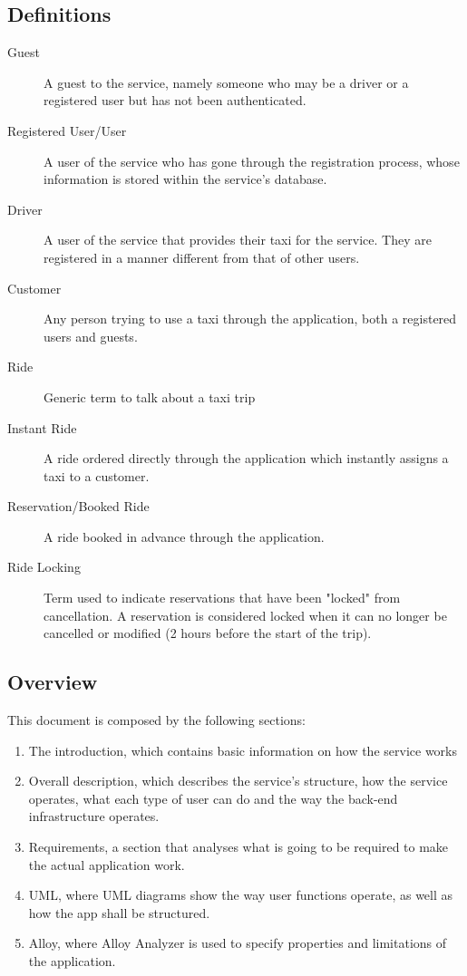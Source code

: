 \subsection{Definitions}
	\begin{description}
		\item[Guest]
			A guest to the service, namely someone who may be a driver or a registered user but has not been authenticated.
		\item[Registered User/User]
			A user of the service who has gone through the registration process, whose information is stored within the service's database.
		\item[Driver]
			A user of the service that provides their taxi for the service. They are registered in a manner different from that of other users.
		\item[Customer]
			Any person trying to use a taxi through the application, both a registered users and guests.
		\item[Ride]
			Generic term to talk about a taxi trip
		\item[Instant Ride]
			A ride ordered directly through the application which instantly assigns a taxi to a customer.
		\item[Reservation/Booked Ride]
			A ride booked in advance through the application.
		\item[Ride Locking]
			Term used to indicate reservations that have been "locked" from cancellation. A reservation is considered locked when it can no 
			longer be cancelled or modified (2 hours before the start of the trip).
	\end{description}
\subsection{Overview}
	This document is composed by the following sections:
	\begin{enumerate}
	\item The introduction, which contains basic information on how the service works
	\item Overall description, which describes the service's structure, how the service operates, what each type of user can do and the way the
	back-end infrastructure operates. 
	\item Requirements, a section that analyses what is going to be required to make the actual application work.
	\item UML, where UML diagrams show the way user functions operate, as well as how the app shall be structured.
	\item Alloy, where Alloy Analyzer is used to specify properties and limitations of the application.
	\end{enumerate}

